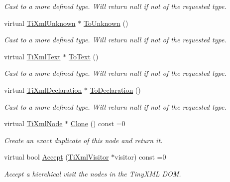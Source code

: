 \begin{DoxyCompactItemize}
\begin{DoxyCompactList}\small\item\em Cast to a more defined type. Will return null if not of the requested type. \end{DoxyCompactList}\item 
virtual \hyperlink{class_ti_xml_unknown}{Ti\+Xml\+Unknown} $\ast$ \hyperlink{class_ti_xml_node_a06de5af852668c7e4af0d09c205f0b0d}{To\+Unknown} ()\hypertarget{class_ti_xml_node_a06de5af852668c7e4af0d09c205f0b0d}{}\label{class_ti_xml_node_a06de5af852668c7e4af0d09c205f0b0d}

\begin{DoxyCompactList}\small\item\em Cast to a more defined type. Will return null if not of the requested type. \end{DoxyCompactList}\item 
virtual \hyperlink{class_ti_xml_text}{Ti\+Xml\+Text} $\ast$ \hyperlink{class_ti_xml_node_a3ddfbcac78fbea041fad57e5c6d60a03}{To\+Text} ()\hypertarget{class_ti_xml_node_a3ddfbcac78fbea041fad57e5c6d60a03}{}\label{class_ti_xml_node_a3ddfbcac78fbea041fad57e5c6d60a03}

\begin{DoxyCompactList}\small\item\em Cast to a more defined type. Will return null if not of the requested type. \end{DoxyCompactList}\item 
virtual \hyperlink{class_ti_xml_declaration}{Ti\+Xml\+Declaration} $\ast$ \hyperlink{class_ti_xml_node_a4027136ca820ff4a636b607231b6a6df}{To\+Declaration} ()\hypertarget{class_ti_xml_node_a4027136ca820ff4a636b607231b6a6df}{}\label{class_ti_xml_node_a4027136ca820ff4a636b607231b6a6df}

\begin{DoxyCompactList}\small\item\em Cast to a more defined type. Will return null if not of the requested type. \end{DoxyCompactList}\item 
virtual \hyperlink{class_ti_xml_node}{Ti\+Xml\+Node} $\ast$ \hyperlink{class_ti_xml_node_abdbb27ef509ba1c5172cbc39fdcb263b}{Clone} () const  =0
\begin{DoxyCompactList}\small\item\em Create an exact duplicate of this node and return it. \end{DoxyCompactList}\item 
virtual bool \hyperlink{class_ti_xml_node_adb1f7da895f8c9e945e6bd406fe34c78}{Accept} (\hyperlink{class_ti_xml_visitor}{Ti\+Xml\+Visitor} $\ast$visitor) const  =0
\begin{DoxyCompactList}\small\item\em Accept a hierchical visit the nodes in the Tiny\+X\+ML D\+OM. \end{DoxyCompactList}\end{DoxyCompactItemize}
